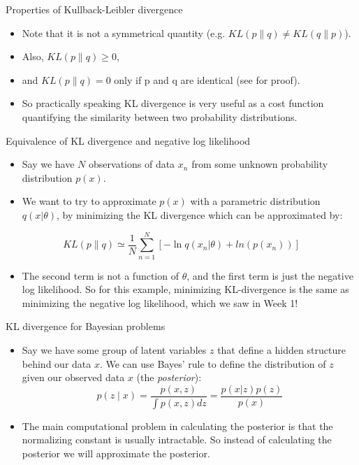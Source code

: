 \documentclass{beamer}
\begin{document}
\begin{frame}{Properties of Kullback-Leibler divergence}
  \begin{itemize}
  \item Note that it is not a symmetrical quantity (e.g. $KL(p\|q) \ne KL(q\|p)$).
  \item Also, $KL(p\|q) \ge 0$,
  \item and $KL(p\|q) = 0$ only if p and q are identical (see \cite{bishop} for proof).
  \item So practically speaking KL divergence is very useful as a cost function quantifying the similarity between two probability distributions.
  \end{itemize}
\end{frame}

\begin{frame}{Equivalence of KL divergence and negative log likelihood}
  \begin{itemize}
  \item Say we have $N$ observations of data $x_n$ from some unknown probability distribution $p(x)$.
  \item We want to try to approximate $p(x)$ with a parametric distribution $q(x|\theta)$, by minimizing the KL divergence which can be approximated by:
  \end{itemize}
  \begin{equation}
    KL(p\|q) \simeq \frac{1}{N} \sum_{n=1}^{N} \left[ -\ln q(x_n | \theta) + ln(p (x_n))\right]
  \end{equation}
  \begin{itemize}
  \item The second term is not a function of $\theta$, and the first term is just the negative log likelihood. So for this example, minimizing KL-divergence is the same as minimizing the negative log likelihood, which we saw in Week 1!
  \end{itemize}
\end{frame}

\begin{frame}{KL divergence for Bayesian problems}
  \begin{itemize}
  \item Say we have some group of latent variables $z$ that define a hidden structure behind our data $x$. We can use Bayes' rule to define the distribution of $z$ given our observed data $x$ (the \textit{posterior}):
    \[p(z \mid x) = \frac{p(x, z)}{\int p(x, z) dz} = \frac{p(x|z) p(z)}{p(x)}\]
  \item The main computational problem in calculating the posterior is that the normalizing constant is usually intractable. So instead of calculating the posterior we will approximate the posterior.
  \end{itemize}
\end{frame}
\end{document}
